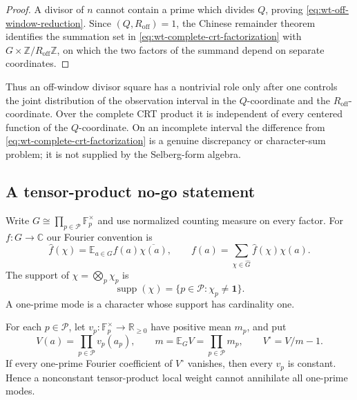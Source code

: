 \begin{proof}
A divisor of $n$ cannot contain a prime which divides $Q$, proving
\eqref{eq:wt-off-window-reduction}.  Since
$(Q,R_{\mathrm{off}})=1$, the Chinese remainder theorem identifies the
summation set in \eqref{eq:wt-complete-crt-factorization} with
$G\times\mathbb Z/R_{\mathrm{off}}\mathbb Z$, on which the two factors of
the summand depend on separate coordinates.
\end{proof}

Thus an off-window divisor square has a nontrivial role only after one
controls the joint distribution of the observation interval in the
$Q$-coordinate and the $R_{\mathrm{off}}$-coordinate.  Over the complete
CRT product it is independent of every centered function of the
$Q$-coordinate.  On an incomplete interval the difference from
\eqref{eq:wt-complete-crt-factorization} is a genuine discrepancy or
character-sum problem; it is not supplied by the Selberg-form algebra.

\subsection{A tensor-product no-go statement}
\label{subsec:tensor-no-go}

Write $G\cong\prod_{p\in\mathcal P}\mathbb F_p^\times$ and use normalized
counting measure on every factor.  For $f:G\to\mathbb C$ our Fourier
convention is
\begin{equation}
 \widehat f(\chi)
 =\mathbb E_{a\in G}f(a)\overline{\chi(a)},
 \qquad
 f(a)=\sum_{\chi\in\widehat G}\widehat f(\chi)\chi(a).
 \label{eq:wt-fourier-convention}
\end{equation}
The support of $\chi=\bigotimes_p\chi_p$ is
\begin{equation}
 \operatorname{supp}(\chi)
 =\{p\in\mathcal P:\chi_p\ne\mathbf1\}.
 \label{eq:wt-character-support}
\end{equation}
A one-prime mode is a character whose support has cardinality one.

\begin{proposition}
\label{prop:wt-tensor-no-go}
For each $p\in\mathcal P$, let
$v_p:\mathbb F_p^\times\to\mathbb R_{\ge0}$ have positive mean $m_p$, and put
\begin{equation}
 V(a)=\prod_{p\in\mathcal P}v_p(a_p),
 \qquad
 m=\mathbb E_G V=\prod_{p\in\mathcal P}m_p,
 \qquad
 V^\circ=V/m-1.
 \label{eq:wt-product-weight}
\end{equation}
If every one-prime Fourier coefficient of $V^\circ$ vanishes, then every
$v_p$ is constant.  Hence a nonconstant tensor-product local weight cannot
annihilate all one-prime modes.
\end{proposition}


